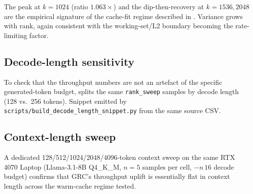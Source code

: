 \documentclass[11pt]{article}
\begin{document}
\begin{table}[h]\centering\footnotesize
\caption{Decode tok/s by rank ($n{=}8$ samples per row, 4~prompts $\times$
2~token lengths).  Ratio is mean GRC throughput divided by the same-pack
baseline mean.}
\label{tab:rank-pareto}

\end{table}

The peak at $k{=}1024$ (ratio $1.063\times$) and the dip-then-recovery at
$k{=}1536, 2048$ are the empirical signature of the cache-fit regime
described in .  Variance grows with rank, again
consistent with the working-set/L2 boundary becoming the rate-limiting
factor.

\subsection{Decode-length sensitivity}
\label{app:decode-length}

To check that the throughput numbers are not an artefact of the specific
generated-token budget,  splits the same
\texttt{rank\_sweep} samples by decode length (128 vs.\ 256 tokens).
Snippet emitted by \texttt{scripts/build\_decode\_length\_snippet.py} from
the same source CSV.

\begin{table}[h]\centering\footnotesize
\caption{Decode tok/s grouped by generated-token budget ($n{=}4$ prompts
per cell, mean$\pm$stdev).  The $k{=}1024$ super-baseline is stable across
both budgets; the $k{=}1536$ row inherits the per-prompt variance reported
in .}
\label{tab:decode-length}

\end{table}

\subsection{Context-length sweep}
\label{sec:ctx-sweep}

A dedicated 128/512/1024/2048/4096-token context sweep on the same RTX
4070 Laptop (Llama-3.1-8B Q4\_K\_M, $n{=}5$ samples per cell, $-n\,16$
decode budget) confirms that GRC's throughput uplift is essentially flat in
context length across the warm-cache regime tested.
\end{document}
